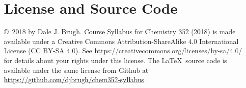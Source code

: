 \documentclass[letterpaper,oneside,onecolumn,11pt,article]{memoir}
\begin{document}
\section{License and Source Code}
\copyright\ 2018 by Dale J. Brugh. Course Syllabus for Chemistry 352 (2018) is made available under a Creative Commons Attribution-ShareAlike 4.0 International License (CC BY-SA 4.0). See \href{https://creativecommons.org/licenses/by-sa/4.0/}{https://creativecommons.org/licenses/by-sa/4.0/} for details about your rights under this license. The \LaTeX\ source code is available under the same license from Github at \href{https://github.com/djbrugh/chem352-syllabus}{https://github.com/djbrugh/chem352-syllabus}. 
\end{document}

